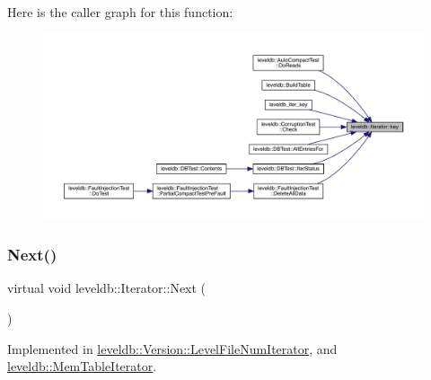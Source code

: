 Here is the caller graph for this function\+:
\nopagebreak
\begin{figure}[H]
\begin{center}
\leavevmode
\includegraphics[width=350pt]{classleveldb_1_1_iterator_ad17feced6e24a1b21db5ae6940c1f220_icgraph}
\end{center}
\end{figure}
\mbox{\label{classleveldb_1_1_iterator_aea54a5ca7eb942eb15770820529410e7}} 
\subsubsection{\texorpdfstring{Next()}{Next()}}
{\footnotesize\ttfamily virtual void leveldb\+::\+Iterator\+::\+Next (\begin{DoxyParamCaption}{ }\end{DoxyParamCaption})\hspace{0.3cm}{\ttfamily [pure virtual]}}



Implemented in \mbox{\hyperlink{classleveldb_1_1_version_1_1_level_file_num_iterator_a7f470d4bd4dd27ff653bd1e61ccfd759}{leveldb\+::\+Version\+::\+Level\+File\+Num\+Iterator}}, and \mbox{\hyperlink{classleveldb_1_1_mem_table_iterator_a8ce5457cf61b989ce1ceec80084f891c}{leveldb\+::\+Mem\+Table\+Iterator}}.

